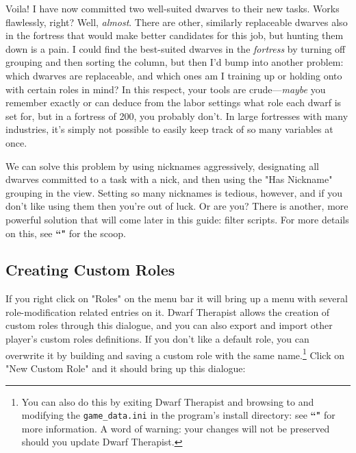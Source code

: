 \documentclass[]{article}
\begin{document}
Voila! I have now committed two well-suited dwarves to their new tasks. Works flawlessly, right? Well,
\emph{almost}. There are other, similarly replaceable dwarves also in the fortress that would make better
candidates for this job, but hunting them down is a pain. I could find the best-suited dwarves in the
\emph{fortress} by turning off grouping and then sorting the column, but then I'd bump into another
problem: which dwarves are replaceable, and which ones am I training up or holding onto with certain
roles in mind? In this respect, your tools are crude---\emph{maybe} you remember exactly or can deduce
from the labor settings what role each dwarf is set for, but in a fortress of 200, you probably don't. In
large fortresses with many industries, it's simply not possible to easily keep track of so many variables
at once.

We can solve this problem by using nicknames aggressively, designating all dwarves committed to a task
with a nick, and then using the "Has Nickname" grouping in the view. Setting so many nicknames is
tedious, however, and if you don't like using them then you're out of luck. Or are you? There is another,
more powerful solution that will come later in this guide: filter scripts. For more details on this, see
\textbf{``"} for the scoop.

\subsection{Creating Custom Roles}
\label{sec:Creating Custom Roles}


If you right click on "Roles" on the menu bar it will bring up a menu with several role-modification
related entries on it. Dwarf Therapist allows the creation of custom roles through
this dialogue, and you can also export and import other player's custom roles definitions. If you don't
like a default role, you can overwrite it by building and saving a custom role with the same
name.\footnote{You can also do this by exiting Dwarf Therapist and browsing to and modifying the
\texttt{game\_data.ini} in the program's install directory: see \textbf{``"} for
more information. A word of warning: your changes will not be preserved should you update Dwarf
Therapist.} Click on "New Custom Role" and it should bring up this dialogue:
\end{document}
